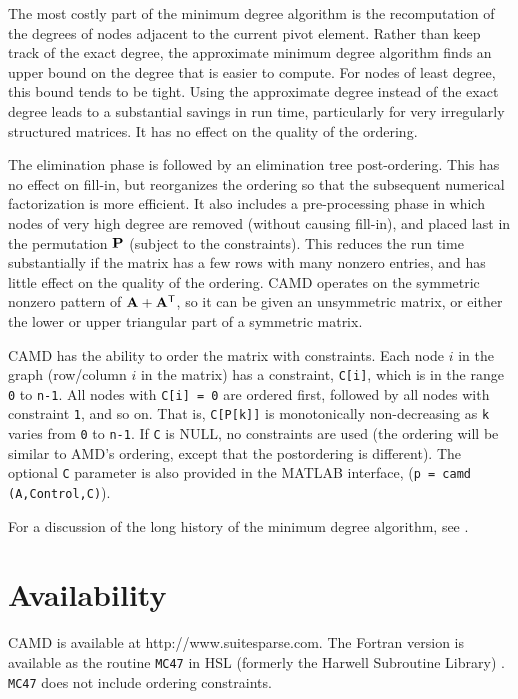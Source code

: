 \documentclass[11pt]{article}
\newcommand{\m}[1]{{\bf{#1}}}       %
\newcommand{\tr}{^{\sf T}}          %
\begin{document}
The most costly part of the minimum degree algorithm is the recomputation
of the degrees of nodes adjacent to the current pivot element.
Rather than keep track of the exact degree, the approximate minimum degree
algorithm finds an upper bound on the degree that is easier to compute.
For nodes of least degree, this bound tends to be tight.  Using the
approximate degree instead of the exact degree leads to a substantial savings
in run time, particularly for very irregularly structured matrices.
It has no effect on the quality of the ordering.

The elimination phase is followed by an
elimination tree post-ordering.  This has no effect on fill-in, but
reorganizes the ordering so that the subsequent numerical factorization is
more efficient.  It also includes a pre-processing phase in which nodes of
very high degree are removed (without causing fill-in), and placed last in the
permutation $\m{P}$ (subject to the constraints).
This reduces the run time substantially if the matrix
has a few rows with many nonzero entries, and has little effect on the quality
of the ordering.
CAMD operates on the
symmetric nonzero pattern of $\m{A}+\m{A}\tr$, so it can be given
an unsymmetric matrix, or either the lower or upper triangular part of
a symmetric matrix.

CAMD has the ability to order the matrix with constraints.  Each
node $i$ in the graph (row/column $i$ in the matrix) has a constraint,
{\tt C[i]}, which is in the range {\tt 0} to {\tt n-1}.  All nodes with
{\tt C[i] = 0} are
ordered first, followed by all nodes with constraint {\tt 1}, and so on.
That is, {\tt C[P[k]]} is monotonically non-decreasing as {\tt k} varies from
{\tt 0} to {\tt n-1}.  If {\tt C} is NULL, no
constraints are used (the ordering will be similar to AMD's ordering,
except that the postordering is different).
The optional {\tt C} parameter is also provided in the MATLAB interface,
({\tt p = camd (A,Control,C)}).

For a discussion of the long history of the minimum degree algorithm,
see \cite{GeorgeLiu89}.

\section{Availability}

CAMD is available at http://www.suitesparse.com.
The Fortran version is available as the routine {\tt MC47} in HSL
(formerly the Harwell Subroutine Library) \cite{hsl:2002}. {\tt MC47} does
not include ordering constraints.
\end{document}

